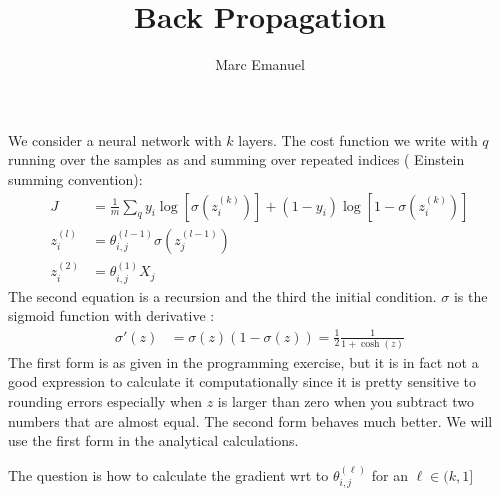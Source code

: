 \documentclass[a4paper,10pt]{article}
\title{Back Propagation}
\author{Marc Emanuel}
\begin{document}
\maketitle
\begin{abstract}

\end{abstract}
We consider a neural network with $k$ layers.  The cost function  we write with $q$ running over the samples as  and summing over repeated indices ( Einstein summing convention):
\begin{align}
  J&= \frac{1}{m}\sum_q   y_i \log[\sigma(z^{(k)}_i)]+(1-y_i)\log[1-\sigma(z^{(k)}_i)]  \\
  z^{(l)}_i &= \theta^{(l-1)}_{i,j} \sigma(z^{(l-1)}_j)  \label{eq:rec}\\
  z^{(2)}_i& = \theta^{(1)}_{i,j} X_j
\end{align}
The second equation is a recursion and the third  the initial condition. $\sigma$ is the sigmoid function with derivative :
\begin{align}
  \sigma'(z) &= \sigma(z)(1-\sigma(z)) = \frac{1}{2}\frac{1}{1+\cosh(z)}
\end{align}
The first form is as given in the programming exercise, but it is in fact not a good expression to calculate it computationally since it is pretty sensitive to rounding errors especially when $z$ is larger than zero when you subtract two numbers that are almost equal. The second form behaves much better. We will use the first form in the analytical calculations.

The question is how to calculate the gradient wrt to $\theta^{(\ell)}_{i,j}$ for an $\ell \in(k,1]$
\end{document}
